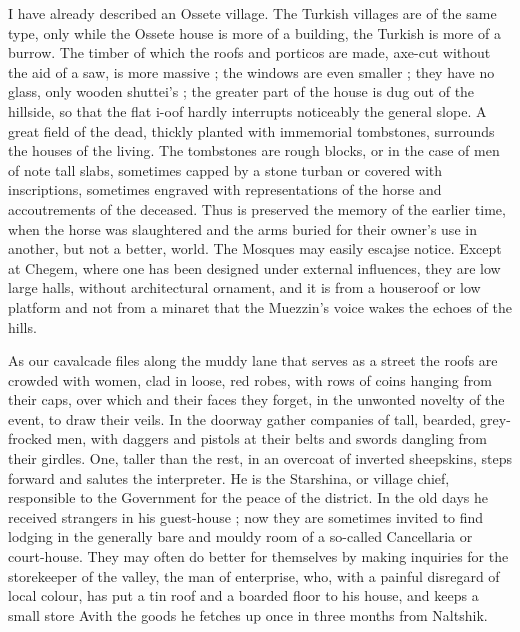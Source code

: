 \documentclass{article}
\begin{document}
	
	I have already described an Ossete village. The Turkish villages are of the same type, only while the Ossete house is more of a building, the Turkish is more of a burrow. The timber of which the roofs and porticos are made, axe-cut without the aid of a saw, is more massive ; the windows are even smaller ; they have no glass, only wooden shuttei's ; the greater part of the house is dug out of the hillside, so that the flat i-oof hardly interrupts noticeably the general slope. A great field of the dead, thickly planted with immemorial tombstones, surrounds the houses of the living. The tombstones are rough blocks, or in the case of men of note tall slabs, sometimes capped by a stone turban or covered with inscriptions, sometimes engraved with representations of the horse and accoutrements of the deceased. Thus is preserved the memory of the earlier time, when the horse was slaughtered and the arms buried for their owner's use in another, but not a better, world. The Mosques may easily escajse notice. Except at Chegem, where one has been designed under external influences, they are low large halls, without architectural ornament, and it is from a houseroof or low platform and not from a minaret that the Muezzin's voice wakes the echoes of the hills.
	
	As our cavalcade files along the muddy lane that serves as a street the roofs are crowded with women, clad in loose, red robes, with rows of coins hanging from their caps, over which and their faces they forget, in the unwonted novelty of the event, to draw their veils. In the doorway gather companies of tall, bearded, grey-frocked men, with daggers and pistols at their belts and swords dangling from their girdles. One, taller than the rest, in an overcoat of inverted sheepskins, steps forward and salutes the interpreter. He is the Starshina, or village chief, responsible to the Government for the peace of the district. In the old days he received strangers in his guest-house ; now they are sometimes invited to find lodging in the generally bare and mouldy room of a so-called Cancellaria or court-house. They may often do better for themselves by making inquiries for the storekeeper of the valley, the man of enterprise, who, with a painful disregard of local colour, has put a tin roof and a boarded floor to his house, and keeps a small store Avith the goods he fetches up once in three months from Naltshik.
	
\end{document}
